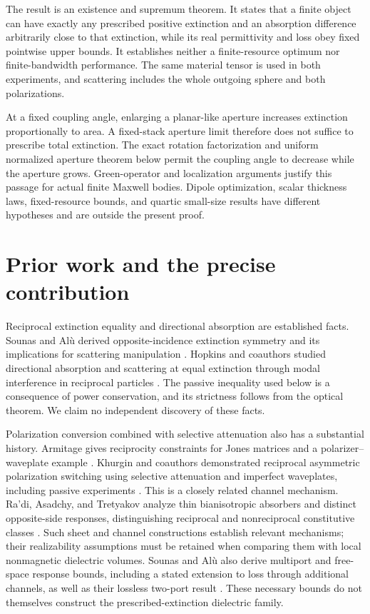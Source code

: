 \documentclass[11pt]{article}
\begin{document}
The result is an existence and supremum theorem. It states that a finite object can have exactly any prescribed positive extinction and an absorption difference arbitrarily close to that extinction, while its real permittivity and loss obey fixed pointwise upper bounds. It establishes neither a finite-resource optimum nor finite-bandwidth performance. The same material tensor is used in both experiments, and scattering includes the whole outgoing sphere and both polarizations.

At a fixed coupling angle, enlarging a planar-like aperture increases extinction proportionally to area. A fixed-stack aperture limit therefore does not suffice to prescribe total extinction. The exact rotation factorization and uniform normalized aperture theorem below permit the coupling angle to decrease while the aperture grows. Green-operator and localization arguments justify this passage for actual finite Maxwell bodies. Dipole optimization, scalar thickness laws, fixed-resource bounds, and quartic small-size results have different hypotheses and are outside the present proof.

\section{Prior work and the precise contribution}\label{sec:prior}
Reciprocal extinction equality and directional absorption are established facts. Sounas and Al\`u derived opposite-incidence extinction symmetry and its implications for scattering manipulation \citep{SounasAlu2014}. Hopkins and coauthors studied directional absorption and scattering at equal extinction through modal interference in reciprocal particles \citep{Hopkins2015}. The passive inequality used below is a consequence of power conservation, and its strictness follows from the optical theorem. We claim no independent discovery of these facts.

Polarization conversion combined with selective attenuation also has a substantial history. Armitage gives reciprocity constraints for Jones matrices and a polarizer--waveplate example \citep{Armitage2014}. Khurgin and coauthors demonstrated reciprocal asymmetric polarization switching using selective attenuation and imperfect waveplates, including passive experiments \citep{Khurgin2021}. This is a closely related channel mechanism. Ra'di, Asadchy, and Tretyakov analyze thin bianisotropic absorbers and distinct opposite-side responses, distinguishing reciprocal and nonreciprocal constitutive classes \citep{Radi2013}. Such sheet and channel constructions establish relevant mechanisms; their realizability assumptions must be retained when comparing them with local nonmagnetic dielectric volumes. Sounas and Al\`u also derive multiport and free-space response bounds, including a stated extension to loss through additional channels, as well as their lossless two-port result \citep{SounasAlu2017}. These necessary bounds do not themselves construct the prescribed-extinction dielectric family.
\end{document}
